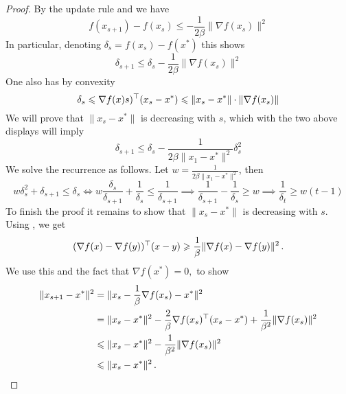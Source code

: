 \begin{proof}
By the update rule and  we have
$$f(x_{s+1}) - f(x_s) \leq -\frac{1}{2\beta}\|\nabla f(x_s)\|^2 $$
In particular, denoting $\delta_s = f(x_s) - f(x^*)$ this shows
$$\delta_{s+1} \leq \delta_s - \frac{1}{2\beta}\|\nabla f(x_s)\|^2 $$
One also has by convexity
$$\delta_s \leqslant \nabla f(x)s)^\top(x_s - x^*) \leqslant \|x_s - x^*\| \cdot \|\nabla f(x_s)\|$$
We will prove that $\|x_s - x^*\|$ is decreasing with $s$, which with the two above displays will imply
$$\delta_{s+1}\leq \delta_s - \frac{1}{2\beta\|x_1 - x^*\|^2}\delta_s^2$$
We solve the recurrence as follows.  Let $w = \frac{1}{2\beta\|x_1 - x^*\|^2}$, then
$$w\delta_s^2 + \delta_{s+1} \leq \delta_s \iff w\frac{\delta_s}{\delta_{s+1}} + \frac
{1}{\delta_s} \leq \frac{1}{\delta_{s+1}} \implies \frac{1}{\delta_{s+1}} - \frac{1}{\delta_s} \geq w \implies \frac{1}{\delta_t} \geq w(t-1)$$
To finish the proof it remains to show that $\|x_s - x^*\|$ is decreasing with $s$.  
Using , we get
\[
(\nabla f(x) - \nabla f(y))^\top(x - y) \geqslant \frac{1}{\beta} \|\nabla f(x)
- \nabla f(y)\|^2\,.
\]
We use this and the fact that $\nabla f(x^*) = 0,$ to show
\begin{align*}
    \|x_{s+1} - x^*\|^2 &= \|x_s - \frac{1}{\beta}\nabla f(x_s) - x^*\|^2 \\
    &= \|x_s - x^*\|^2 - \frac{2}{\beta}\nabla f(x_s)^\top(x_s - x^*) + \frac{1}{\beta^2}\|\nabla f(x_s)\|^2 \\
    &\leqslant \|x_s - x^*\|^2 - \frac{1}{\beta^2} \|\nabla f(x_s)\|^2 \\
    &\leqslant \|x_s - x^*\|^2\,.
\end{align*}
\end{proof}

